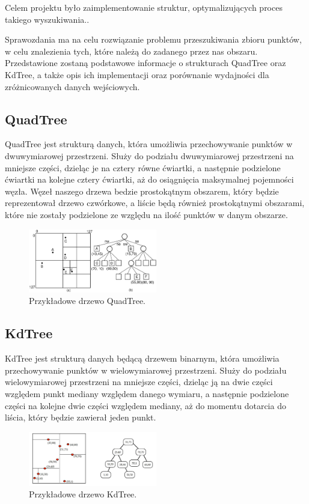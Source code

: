\documentclass{lab}
\begin{document}
Celem projektu było zaimplementowanie struktur, optymalizujących proces takiego wyszukiwania..

Sprawozdania ma na celu rozwiązanie problemu przeszukiwania zbioru punktów, w celu znalezienia tych, które należą do zadanego przez nas obszaru. 
Przedstawione zostaną podstawowe informacje o strukturach QuadTree oraz KdTree, a także opis ich implementacji oraz porównanie wydajności dla zróżnicowanych danych wejściowych.

\subsection{QuadTree}
QuadTree jest strukturą danych, która umożliwia przechowywanie punktów w dwuwymiarowej przestrzeni. 
Służy do podziału dwuwymiarowej przestrzeni na mniejsze części, dzieląc je na cztery równe ćwiartki, a następnie podzielone ćwiartki na kolejne cztery ćwiartki, aż do osiągnięcia maksymalnej pojemności węzła.
Węzeł naszego drzewa bedzie prostokątnym obszarem, który będzie reprezentował drzewo czwórkowe, a liście będą również prostokątnymi obszarami, które nie zostały podzielone ze względu na ilość punktów w danym obszarze.
\begin{figure}[H]
  \centering
  \includegraphics[width=0.5\textwidth]{resources/quadtree.png}
  \caption{Przykładowe drzewo QuadTree.}
  \label{fig:quadtree}
\end{figure}

\subsection{KdTree}
KdTree jest strukturą danych będącą drzewem binarnym, która umożliwia przechowywanie punktów w wielowymiarowej przestrzeni.
Służy do podziału wielowymiarowej przestrzeni na mniejsze części, dzieląc ją na dwie części względem punkt mediany względem danego wymiaru, 
a następnie podzielone części na kolejne dwie części względem mediany, aż do momentu dotarcia do liścia, który będzie zawierał jeden punkt.
\begin{figure}[H]
  \centering
  \includegraphics[width=0.5\textwidth]{resources/kdtree.jpg}
  \caption{Przykładowe drzewo KdTree.}
  \label{fig:kdtree}
\end{figure}
\end{document}
